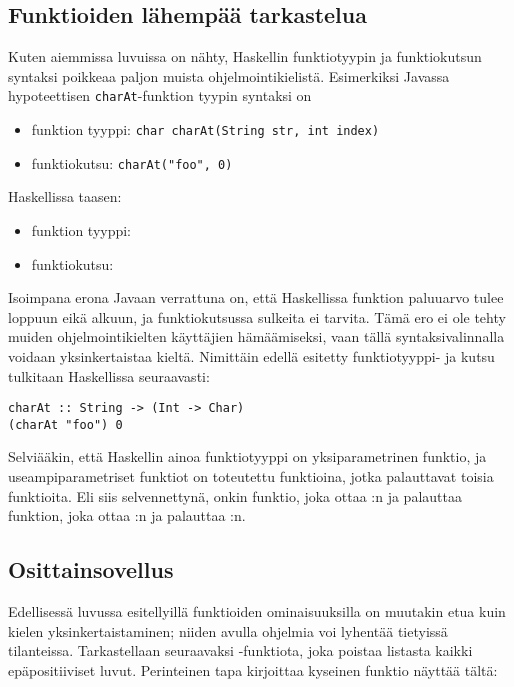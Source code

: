 \iffalse
\subsection{Funktioiden lähempää tarkastelua}
Kuten aiemmissa luvuissa on nähty,
Haskellin funktiotyypin ja funktiokutsun syntaksi poikkeaa paljon muista ohjelmointikielistä.
Esimerkiksi Javassa hypoteettisen \texttt{charAt}-funktion tyypin syntaksi on

\begin{itemize}
    \item funktion tyyppi: \texttt{char charAt(String str, int index)}
    \item funktiokutsu: \texttt{charAt("foo", 0)}
\end{itemize}
Haskellissa taasen:
\begin{itemize}
    \item funktion tyyppi: 
    \item funktiokutsu: 
\end{itemize}

Isoimpana erona Javaan verrattuna on, että Haskellissa funktion paluuarvo tulee loppuun eikä alkuun,
ja funktiokutsussa sulkeita ei tarvita.
Tämä ero ei ole tehty muiden ohjelmointikielten käyttäjien hämäämiseksi,
vaan tällä syntaksivalinnalla voidaan yksinkertaistaa kieltä.
Nimittäin edellä esitetty funktiotyyppi- ja kutsu tulkitaan Haskellissa seuraavasti:

\begin{verbatim}
charAt :: String -> (Int -> Char)
(charAt "foo") 0
\end{verbatim}

Selviääkin, että Haskellin ainoa funktiotyyppi on yksiparametrinen funktio,
ja useampiparametriset funktiot on toteutettu funktioina, jotka palauttavat toisia funktioita.
Eli siis selvennettynä,
 onkin funktio, joka ottaa :n ja palauttaa funktion,
joka ottaa :n ja palauttaa :n.

\subsection{Osittainsovellus}
Edellisessä luvussa esitellyillä funktioiden ominaisuuksilla on muutakin etua
kuin kielen yksinkertaistaminen; niiden avulla ohjelmia voi lyhentää tietyissä tilanteissa.
Tarkastellaan seuraavaksi -funktiota, joka poistaa listasta kaikki
epäpositiiviset luvut.
Perinteinen tapa kirjoittaa kyseinen funktio näyttää tältä:

